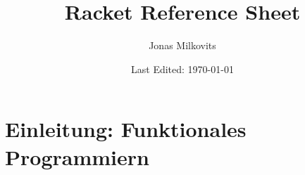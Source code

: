

\renewcommand{\arraystretch}{1.75} 

\begin{titlepage}
  \title{Racket Reference Sheet} %
  \author{Jonas Milkovits}
  \date{Last Edited: \today}
\end{titlepage}



\maketitle
{} %
\tableofcontents
\clearpage
{} %

\section{Einleitung: Funktionales Programmiern}

